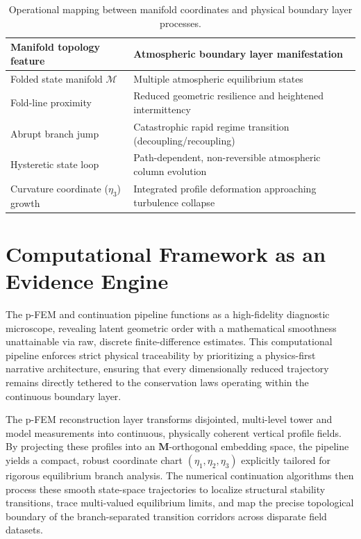 \documentclass[12pt,a4paper]{article}
\newcommand{\mat}[1]{\mathbf{#1}}
\begin{document}
\begin{table}[h]
\centering
\small
\begin{tabular}{@{}ll@{}}
\toprule
\textbf{Manifold topology feature} & \textbf{Atmospheric boundary layer manifestation} \\
\midrule
Folded state manifold $\mathcal{M}$ & Multiple atmospheric equilibrium states \\
Fold-line proximity & Reduced geometric resilience and heightened intermittency \\
Abrupt branch jump & Catastrophic rapid regime transition (decoupling/recoupling) \\
Hysteretic state loop & Path-dependent, non-reversible atmospheric column evolution \\
Curvature coordinate ($\eta_3$) growth & Integrated profile deformation approaching turbulence collapse \\
\bottomrule
\end{tabular}
\caption{Operational mapping between manifold coordinates and physical boundary layer processes.}
\end{table}

\section{Computational Framework as an Evidence Engine}

The p-FEM and continuation pipeline functions as a high-fidelity diagnostic microscope, revealing latent geometric order with a mathematical smoothness unattainable via raw, discrete finite-difference estimates. This computational pipeline enforces strict physical traceability by prioritizing a physics-first narrative architecture, ensuring that every dimensionally reduced trajectory remains directly tethered to the conservation laws operating within the continuous boundary layer.

The p-FEM reconstruction layer transforms disjointed, multi-level tower and model measurements into continuous, physically coherent vertical profile fields. By projecting these profiles into an $\mat{M}$-orthogonal embedding space, the pipeline yields a compact, robust coordinate chart $(\eta_1, \eta_2, \eta_3)$ explicitly tailored for rigorous equilibrium branch analysis. The numerical continuation algorithms then process these smooth state-space trajectories to localize structural stability transitions, trace multi-valued equilibrium limits, and map the precise topological boundary of the branch-separated transition corridors across disparate field datasets.
\end{document}
